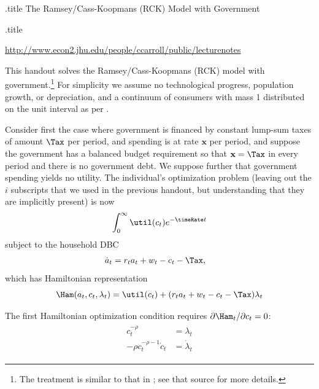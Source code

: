 \documentclass{handout}\usepackage{handoutSetup}\usepackage{handoutShortcuts}
\begin{document}
\handoutHeader

\begin{verbatimwrite}{\jobname.title}
The Ramsey/Cass-Koopmans (RCK) Model with Government
\end{verbatimwrite}

\centerline{\LARGE  \jobname.title}
\medskip 
\centerline{\url{http://www.econ2.jhu.edu/people/ccarroll/public/lecturenotes}}

\medskip \medskip

This handout solves the Ramsey/Cass-Koopmans (RCK) model with government.\footnote{The treatment is similar
to that in \cite{blanchard&fischer:text}; see that source for more details.}  For simplicity we assume
no technological progress, population growth, or depreciation, and a 
continuum of consumers with mass 1 distributed on the unit interval
as per .

Consider first the case where government is financed by constant 
lump-sum taxes of amount $\Tax$ per period, and spending is at rate 
$\mathbf{x}$ per period, and suppose the government has a balanced budget 
requirement so that $\mathbf{x} = \Tax$ in every period and there is no 
government debt.  We suppose further that government spending yields 
no utility.  The individual's optimization problem (leaving out the $i$ 
subscripts that we used in the previous handout, but understanding that 
they are implicitly present) is now
\begin{equation}\begin{gathered}\begin{aligned}
        \int_{0}^{\infty} \util(c_{t}) e^{-\timeRate t}
\end{aligned}\end{gathered}\end{equation}
subject to the household DBC
\begin{equation}\begin{gathered}\begin{aligned}
        \dot{a}_{t} & =  r_{t} a_{t} + w_{t} - c_{t} - \Tax, \label{eq:hhbc}
\end{aligned}\end{gathered}\end{equation}
which has Hamiltonian representation
\begin{displaymath}
        \Ham(a_{t},c_{t},\lambda_{t}) = \util(c_{t}) + (r_{t}a_{t} + w_{t} - c _{t} - \Tax)\lambda_{t}
\end{displaymath}

The first Hamiltonian optimization condition requires $\partial 
\Ham_{t}/\partial c_{t} = 0$:
\begin{equation}\begin{gathered}\begin{aligned}
        c_{t}^{-\rho} & =  \lambda _{t}  \label{eq:H1A} \\
        -\rho c^{-\rho-1}_{t}\dot{c}_{t} & =  \dot{\lambda}_{t}
\end{aligned}\end{gathered}\end{equation}
\end{document}
